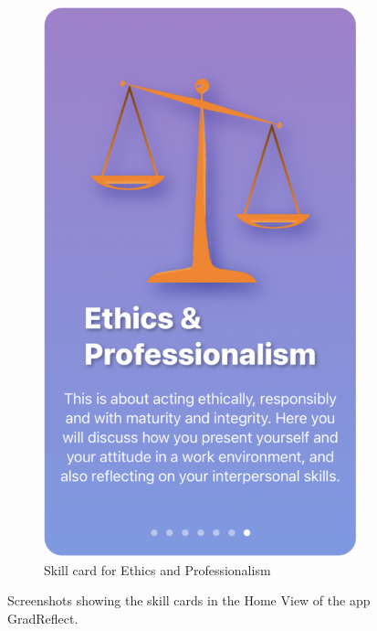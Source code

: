 \documentclass{l4proj}
\begin{document}
\begin{appendices}
\begin{figure}[H]
\begin{subfigure}[b]{0.3\textwidth}
        \includegraphics[scale=0.25]{images/E-ProCard.pdf}
        \caption{Skill card for Ethics and Professionalism}
        \label{fig:E-ProCard}
    \end{subfigure} 
    \caption{Screenshots showing the skill cards in the Home View of the app GradReflect.}
    \label{fig:AllSkillCards}
\end{figure}



%


\end{appendices}
\end{document}
